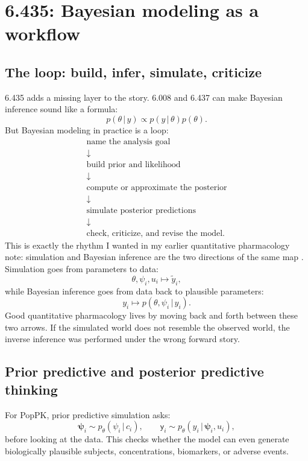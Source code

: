 \documentclass[a4paper]{article}
\newcommand{\rv}[1]{\mathsf{#1}}
\newcommand{\rpsi}{\boldsymbol{\psi}}
\newcommand{\given}{\,|\,}
\begin{document}
\section{6.435: Bayesian modeling as a workflow}

\subsection{The loop: build, infer, simulate, criticize}

6.435 adds a missing layer to the story.  6.008 and 6.437 can make Bayesian inference sound like a formula:
\[
  p(\theta\given y)\propto p(y\given\theta)p(\theta).
\]
But Bayesian modeling in practice is a loop:
\[
  \begin{array}{c}
    \text{name the analysis goal}\\
    \downarrow\\
    \text{build prior and likelihood}\\
    \downarrow\\
    \text{compute or approximate the posterior}\\
    \downarrow\\
    \text{simulate posterior predictions}\\
    \downarrow\\
    \text{check, criticize, and revise the model}.
  \end{array}
\]
This is exactly the rhythm I wanted in my earlier quantitative pharmacology note: simulation and Bayesian inference are the two directions of the same map \cite{hong2020quantpharm}.  Simulation goes from parameters to data:
\[
  \theta,\psi_i,u_i
  \longmapsto
  \tilde y_i,
\]
while Bayesian inference goes from data back to plausible parameters:
\[
  y_i
  \longmapsto
  p(\theta,\psi_i\given y_i).
\]
Good quantitative pharmacology lives by moving back and forth between these two arrows.  If the simulated world does not resemble the observed world, the inverse inference was performed under the wrong forward story.

\subsection{Prior predictive and posterior predictive thinking}

For PopPK, prior predictive simulation asks:
\[
  \rpsi_i\sim p_\theta(\psi_i\given c_i),
  \qquad
  \rv{y}_i\sim p_\theta(y_i\given \rpsi_i,u_i),
\]
before looking at the data.  This checks whether the model can even generate biologically plausible subjects, concentrations, biomarkers, or adverse events.
\end{document}
